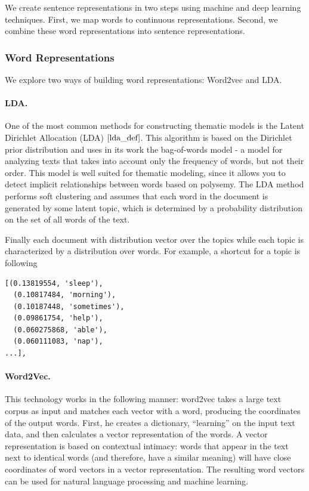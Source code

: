 \documentclass[11pt]{article}
\begin{document}
We create sentence representations in two steps using machine and deep learning techniques. First, we map words to continuous representations. Second, we combine these word representations into sentence representations. 

\subsubsection{Word Representations}

We explore two ways of building word representations: Word2vec and LDA.


\paragraph{LDA.} One of the most common methods for constructing thematic models is the Latent Dirichlet Allocation (LDA) $\cite{lda_def}$. This algorithm is based on the Dirichlet prior distribution and uses in its work the bag-of-words model - a model for analyzing texts that takes into account only the frequency of words, but not their order. This model is well suited for thematic modeling, since it allows you to detect implicit relationships between words based on polysemy. The LDA method performs soft clustering and assumes that each word in the document is generated by some latent topic, which is determined by a probability distribution on the set of all words of the text.

Finally each document with distribution vector over the topics while each topic is characterized by a distribution over words. For example, a shortcut for a topic is following

\begin{lstlisting}
[(0.13819554, 'sleep'),
  (0.10817484, 'morning'),
  (0.10187448, 'sometimes'),
  (0.09861754, 'help'),
  (0.060275868, 'able'),
  (0.060111083, 'nap'),
...],
\end{lstlisting}


\paragraph{Word2Vec.} This technology works in the following manner: word2vec takes a large text corpus as input and matches each vector with a word, producing the coordinates of the output words. First, he creates a dictionary, “learning” on the input text data, and then calculates a vector representation of the words. A vector representation is based on contextual intimacy: words that appear in the text next to identical words (and therefore, have a similar meaning) will have close coordinates of word vectors in a vector representation. The resulting word vectors can be used for natural language processing and machine learning.
\end{document}
